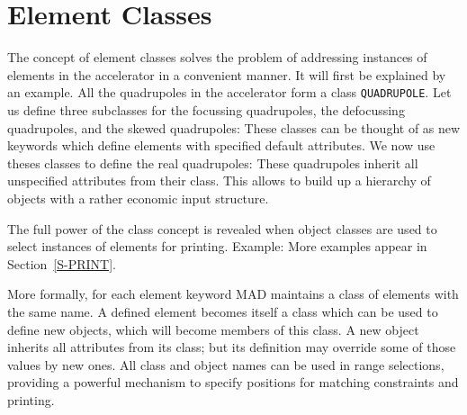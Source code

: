\section{Element Classes}
\label{S-CLASS}
The concept of element classes solves the problem of addressing
instances of elements in the accelerator in a convenient manner.
It will first be explained by an example.
All the quadrupoles in the accelerator form a class {\tt QUADRUPOLE}.
Let us define three subclasses for the focussing quadrupoles,
the defocussing quadrupoles, and the skewed quadrupoles:
These classes can be thought of as new keywords which define
elements with specified default attributes.
We now use theses classes to define the real quadrupoles:
These quadrupoles inherit all unspecified attributes from their class.
This allows to build up a hierarchy of objects with a rather
economic input structure.
 
The full power of the class concept is revealed when object classes
are used to select instances of elements for printing.
Example:
More examples appear in Section~\ref{S-PRINT}.
 
More formally, for each element keyword MAD maintains a
class of elements with the same name.
A defined element becomes itself a class which can be used
to define new objects,
which will become members of this class.
A new object inherits all attributes from its class;
but its definition may override some of those values by new ones.
All class and object names can be used in range selections,
providing a powerful mechanism to specify positions
for matching constraints and printing.
\pagebreak[1]
 
